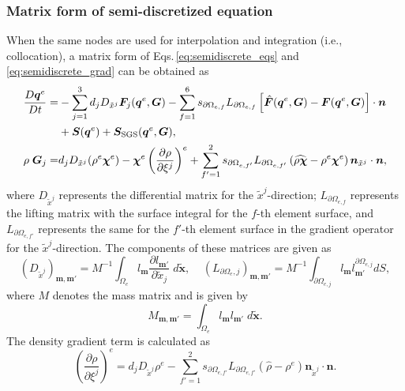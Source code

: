 \subsubsection{Matrix form of semi-discretized equation}
When the same nodes are used for interpolation and integration (i.e., collocation), 
a matrix form of Eqs.\,\eqref{eq:semidiscrete_eqs} and \eqref{eq:semidiscrete_grad} can be obtained as   
\begin{align}
    \dfrac{D \bm{q}^e}{Dt} 
    =&
      - \sum_{j=1}^{3} d_j D_{\tilde{x}^j} \bm{F}_j  (\bm{q}^e,\bm{G})
      - \sum_{f=1}^{6} s_{\partial \Omega_{e,f}} L_{\partial \Omega_{e,f}} \left[ \hat{\bm{F}} (\bm{q}^e,\bm{G}) 
                 - \bm{F}  (\bm{q}^e,\bm{G}) \right] 
               \cdot \bm{n} \nonumber \\
      &+ \bm{S} (\bm{q}^e) + \bm{S}_{\rm SGS} (\bm{q}^e,\bm{G}), 
\label{eq:semidiscrete_eqs_matform} 
\\
  \rho \; \bm{G}_j
  =&
  d_j D_{\tilde{x}^j} (\rho^e \bm{\chi}^e) 
    - \bm{\chi}^e  \left(\dfrac{\partial \rho}{\partial \xi^j}\right)^e
  + \sum_{f'=1}^2 s_{\partial \Omega_{e,f'}} L_{\partial \Omega_{e,f'}} \left( \widehat{\rho\bm{\chi}} - \rho^e \bm{\chi}^e \right)\bm{n}_{\tilde{x}^j}  \cdot \bm{n}, 
\label{eq:semidiscrete_eqs_aux_matform}
\end{align}
where 
$D_{\tilde{x}^j}$ represents the differential matrix for the $\tilde{x}^j$-direction; 
$L_{\partial \Omega_{e,f}}$ represents the lifting matrix with the surface integral for the $f$-th element surface, 
and $L_{\partial \Omega_{e,f'}}$ represents the same for the $f'$-th element surface in the gradient operator for the $\tilde{x}^j$-direction. 
The components of these matrices are given as 
\begin{equation}
 \left( D_{\tilde{x}^j} \right)_{\bm{m},\bm{m}'} 
 = M^{-1} \int_{\Omega_e}  l_{\bm{m}} \dfrac{\partial l_{\bm{m}'}}{\partial \tilde{x}_j}  \; d\tilde{\bm{x}}, 
 \;\;\;\;
 \left( L_{\partial \Omega_e,j} \right)_{\bm{m},{\bm{m}'}} 
 = M^{-1} \int_{\partial \Omega_{e,j}}  l_{\bm{m}} l^{\partial \Omega_{e,j}}_{\bm{m}'} dS, 
\label{eq:differential_and_lifting_matrix}
\end{equation}
where $M$ denotes the mass matrix and is given by
\begin{equation}
 M_{\bm{m},\bm{m}'} 
  = \int_{\Omega_e}  l_{\bm{m}} l_{\bm{m}'}  \; d\tilde{\bm{x}}.
\label{eq:mass_matrix}
\end{equation}
The density gradient term is calculated as  
\begin{equation}
\left(\dfrac{\partial \rho}{\partial \xi^j}\right)^e
= 
d_j  D_{\tilde{x}^j} \rho^e
- \sum_{f'=1}^2 s_{\partial \Omega_{e,f'}} L_{\partial \Omega_{e,f'}} \left( \widehat{\rho} - \rho^e \right)\bm{n}_{\tilde{x}^j}  \cdot \bm{n}.   
\label{eq:semidiscrete_density_gradient_matform}
\end{equation}
